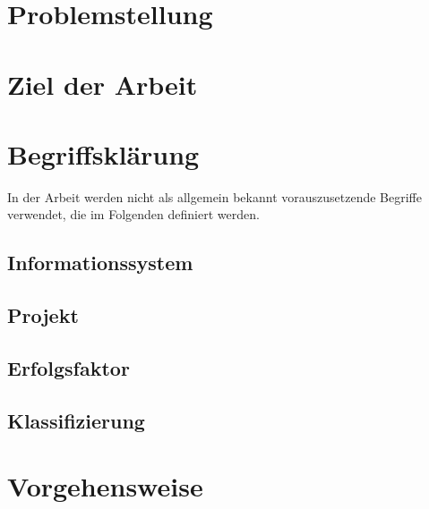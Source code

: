 \documentclass[12pt,a4paper,oneside]{article}
\begin{document}

\newpage



\setcounter{page}{2}
\tableofcontents{}
\clearpage

\newpage


\onehalfspacing

\section{Problemstellung}

\section{Ziel der Arbeit}

\section{Begriffsklärung}
In der Arbeit werden nicht als allgemein bekannt vorauszusetzende Begriffe verwendet, die im Folgenden definiert werden.
\subsection{Informationssystem}

\subsection{Projekt}

\subsection{Erfolgsfaktor}

\subsection{Klassifizierung}

\section{Vorgehensweise}

\end{document}
